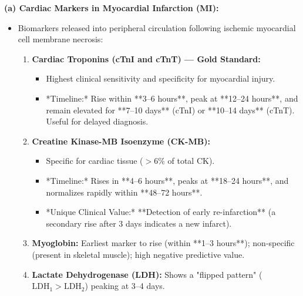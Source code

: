 \documentclass[11pt,a4paper]{article}
\begin{document}
\begin{ansbox}
\textbf{(a) Cardiac Markers in Myocardial Infarction (MI):}
\begin{itemize}[leftmargin=*]
    \item Biomarkers released into peripheral circulation following ischemic myocardial cell membrane necrosis:
    \begin{enumerate}
        \item \textbf{Cardiac Troponins (cTnI and cTnT) --- Gold Standard:}
        \begin{itemize}
            \item Highest clinical sensitivity and specificity for myocardial injury.
            \item *Timeline:* Rise within **3--6 hours**, peak at **12--24 hours**, and remain elevated for **7--10 days** (cTnI) or **10--14 days** (cTnT). Useful for delayed diagnosis.
        \end{itemize}
        \item \textbf{Creatine Kinase-MB Isoenzyme (CK-MB):}
        \begin{itemize}
            \item Specific for cardiac tissue ($>6\%$ of total CK).
            \item *Timeline:* Rises in **4--6 hours**, peaks at **18--24 hours**, and normalizes rapidly within **48--72 hours**.
            \item *Unique Clinical Value:* **Detection of early re-infarction** (a secondary rise after 3 days indicates a new infarct).
        \end{itemize}
        \item \textbf{Myoglobin:} Earliest marker to rise (within **1--3 hours**); non-specific (present in skeletal muscle); high negative predictive value.
        \item \textbf{Lactate Dehydrogenase (LDH):} Shows a "flipped pattern" ($\text{LDH}_1 > \text{LDH}_2$) peaking at 3--4 days.
    \end{enumerate}
\end{itemize}


\end{ansbox}
\end{document}
